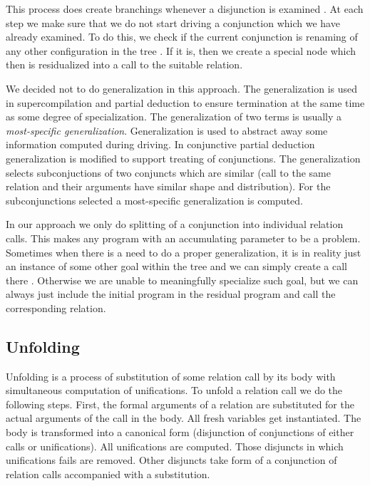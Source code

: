 This process does create branchings whenever a disjunction is examined .
At each step we make sure that we do not start driving a conjunction which we have already examined.
To do this, we check if the current conjunction is renaming of any other configuration in the tree .
If it is, then we create a special node which then is residualized into a call to the suitable relation.

We decided not to do generalization in this approach.
The generalization is used in supercompilation and partial deduction to ensure termination at the same time as some degree of specialization.
The generalization of two terms is usually a \emph{most-specific generalization}.
Generalization is used to abstract away some information computed during driving.
In conjunctive partial deduction generalization is modified to support treating of conjunctions.
The generalization selects subconjuctions of two conjuncts which are similar (call to the same relation and their arguments have similar shape and distribution).
For the subconjunctions selected a most-specific generalization is computed.

In our approach we only do splitting of a conjunction into individual relation calls.
This makes any program with an accumulating parameter to be a problem.
Sometimes when there is a need to do a proper generalization, it is in reality just an instance of some other goal within the tree and we can simply create a call there .
Otherwise we are unable to meaningfully specialize such goal, but we can always just include the initial program in the residual program and call the corresponding relation.


\subsection{Unfolding}

Unfolding is a process of substitution of some relation call by its body with simultaneous computation of unifications.
To unfold a relation call we do the following steps.
First, the formal arguments of a relation are substituted for the actual arguments of the call in the body.
All fresh variables get instantiated.
The body is transformed into a canonical form (disjunction of conjunctions of either calls or unifications).
All unifications are computed.
Those disjuncts in which unifications fails are removed.
Other disjuncts take form of a conjunction of relation calls accompanied with a substitution.

